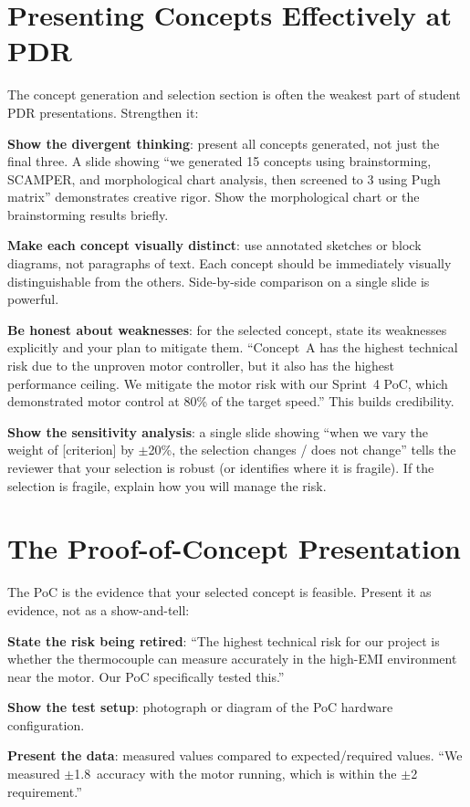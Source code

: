 \section{Presenting Concepts Effectively at PDR}
The concept generation and selection section is often the weakest part of student PDR presentations. Strengthen it:

\textbf{Show the divergent thinking}: present all concepts generated, not just the final three. A slide showing ``we generated 15 concepts using brainstorming, SCAMPER, and morphological chart analysis, then screened to 3 using Pugh matrix'' demonstrates creative rigor. Show the morphological chart or the brainstorming results briefly.

\textbf{Make each concept visually distinct}: use annotated sketches or block diagrams, not paragraphs of text. Each concept should be immediately visually distinguishable from the others. Side-by-side comparison on a single slide is powerful.

\textbf{Be honest about weaknesses}: for the selected concept, state its weaknesses explicitly and your plan to mitigate them. ``Concept~A has the highest technical risk due to the unproven motor controller, but it also has the highest performance ceiling. We mitigate the motor risk with our Sprint~4 PoC, which demonstrated motor control at 80\% of the target speed.'' This builds credibility.

\textbf{Show the sensitivity analysis}: a single slide showing ``when we vary the weight of [criterion] by $\pm$20\%, the selection changes / does not change'' tells the reviewer that your selection is robust (or identifies where it is fragile). If the selection is fragile, explain how you will manage the risk.

\section{The Proof-of-Concept Presentation}
The PoC is the evidence that your selected concept is feasible. Present it as evidence, not as a show-and-tell:

\textbf{State the risk being retired}: ``The highest technical risk for our project is whether the thermocouple can measure accurately in the high-EMI environment near the motor. Our PoC specifically tested this.''

\textbf{Show the test setup}: photograph or diagram of the PoC hardware configuration.

\textbf{Present the data}: measured values compared to expected/required values. ``We measured $\pm$1.8\,\degC{} accuracy with the motor running, which is within the $\pm$2\,\degC{} requirement.''

